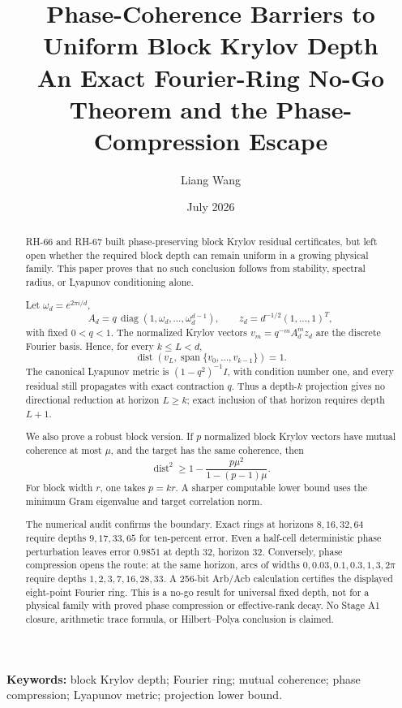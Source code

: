 \documentclass[11pt]{article}
\title{Phase-Coherence Barriers to Uniform Block Krylov Depth\\
\large An Exact Fourier-Ring No-Go Theorem and the Phase-Compression Escape}
\author{Liang Wang}
\date{July 2026}
\newcommand{\dist}{\operatorname{dist}}
\begin{document}
\maketitle

\begin{abstract}
RH-66 and RH-67 built phase-preserving block Krylov residual certificates,
but left open whether the required block depth can remain uniform in a
growing physical family.  This paper proves that no such conclusion follows
from stability, spectral radius, or Lyapunov conditioning alone.

Let $\omega_d=e^{2\pi i/d}$,
\[
 A_d=q\,\operatorname{diag}(1,\omega_d,\ldots,\omega_d^{d-1}),
 \qquad z_d=d^{-1/2}(1,\ldots,1)^T,
 \]
with fixed $0<q<1$.  The normalized Krylov vectors
$v_m=q^{-m}A_d^mz_d$ are the discrete Fourier basis.  Hence, for every
$k\le L<d$,
\[
 \dist\!\left(v_L,\operatorname{span}\{v_0,\ldots,v_{k-1}\}\right)=1.
\]
The canonical Lyapunov metric is $(1-q^2)^{-1}I$, with condition number one,
and every residual still propagates with exact contraction $q$.  Thus a
depth-$k$ projection gives no directional reduction at horizon $L\ge k$;
exact inclusion of that horizon requires depth $L+1$.

We also prove a robust block version.  If $p$ normalized block Krylov vectors
have mutual coherence at most $\mu$, and the target has the same coherence,
then
\[
 \dist^2\ge
 1-\frac{p\mu^2}{1-(p-1)\mu}.
\]
For block width $r$, one takes $p=kr$.  A sharper computable lower bound uses
the minimum Gram eigenvalue and target correlation norm.

The numerical audit confirms the boundary.  Exact rings at horizons
$8,16,32,64$ require depths $9,17,33,65$ for ten-percent error.  Even a
half-cell deterministic phase perturbation leaves error $0.9851$ at depth
$32$, horizon $32$.  Conversely, phase compression opens the route: at the
same horizon, arcs of widths $0,0.03,0.1,0.3,1,3,2\pi$ require depths
$1,2,3,7,16,28,33$.  A 256-bit Arb/Acb calculation certifies the displayed
eight-point Fourier ring.  This is a no-go result for universal fixed depth,
not for a physical family with proved phase compression or effective-rank
decay.  No Stage A1 closure, arithmetic trace formula, or Hilbert--Polya
conclusion is claimed.
\end{abstract}

\noindent\textbf{Keywords:} block Krylov depth; Fourier ring; mutual
coherence; phase compression; Lyapunov metric; projection lower bound.
\end{document}
